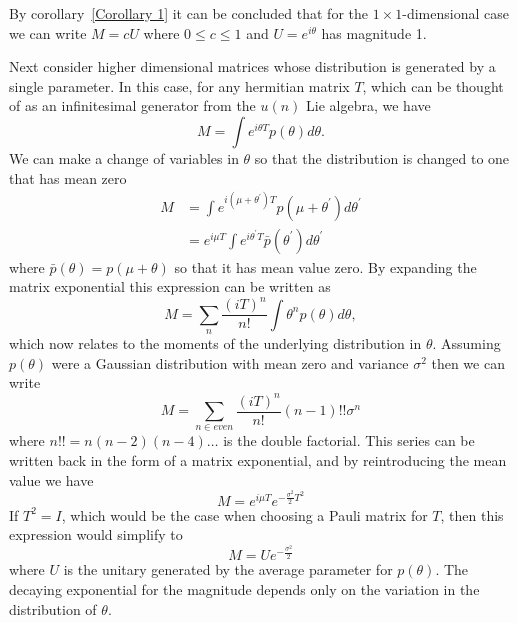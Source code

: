 \documentclass[aps,pra,twocolumn,superscriptaddress,numerical,floatfix]{revtex4-1}
\begin{document}
By corollary~\ref{Corollary 1} it can be concluded that for the $1\times1$-dimensional case we can write $M=cU$ where $0 \leq c \leq 1$ and $U=e^{i\theta}$ has magnitude 1.  


Next consider higher dimensional matrices whose distribution is generated by a single parameter.  In this case, for any hermitian matrix $T$, which can be thought of as an infinitesimal generator from the $u(n)$ Lie algebra, we have
\begin{equation}
	M=\int e^{i\theta T}p(\theta)d\theta 
	\label{eq:single parameter, multi-mode}.
\end{equation}
We can make a change of variables in $\theta$ so that the distribution is changed to one that has mean zero
\begin{align}
	M&=\int e^{i(\mu + \theta^\prime)T} p(\mu + \theta^\prime) d\theta^\prime\\
	&= e^{i\mu T} \int e^{i\theta^\prime T} \bar{p}(\theta^\prime) d\theta^\prime \label{eq:seperating errors and transformations}
\end{align}
where $\bar{p}(\theta) = p(\mu + \theta)$ so that it has mean value zero.  By expanding the matrix exponential this expression can be written as
\begin{equation}
	M=\sum_n \frac{(iT)^n}{n!} \int \theta^n p(\theta) d\theta,
\end{equation}
which now relates to the moments of the underlying distribution in $\theta$. Assuming $p(\theta)$ were a Gaussian distribution with mean zero and variance $\sigma^2$ then we can write
\begin{equation}
	M = \sum_{n \in even} \frac{(iT)^n}{n!} (n-1)!! \sigma^n
\end{equation}
where $n!! = n(n-2)(n-4)\dots$ is the double factorial.  This series can be written back in the form of a matrix exponential, and by reintroducing the mean value we have
\begin{equation}
	M = e^{i\mu T} e^{-\frac{\sigma^2}{2} T^2}
\end{equation}
If $T^2=I$, which would be the case when choosing a Pauli matrix for $T$, then this expression would simplify to
\begin{equation}
M=Ue^{-\frac{\sigma^2}{2}}  \label{eq:Gaussian Psuccess}
\end{equation}
where $U$ is the unitary generated by the average parameter for $p(\theta)$.  The decaying exponential for the magnitude depends only on the variation in the distribution of $\theta$.
\end{document}
